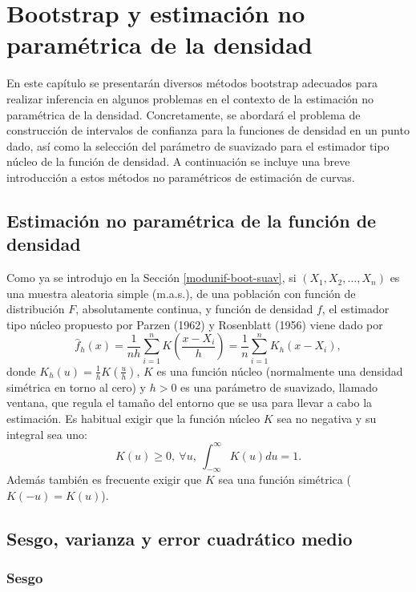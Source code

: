 \documentclass[
]{book}
\theoremstyle{break}
\theoremstyle{nonumberplain}
\begin{document}
\chapter{Bootstrap y estimación no paramétrica de la densidad}\label{npden}

En este capítulo se presentarán diversos métodos bootstrap adecuados
para realizar inferencia en algunos problemas en el contexto de la
estimación no paramétrica de la densidad. Concretamente, se abordará el
problema de construcción de intervalos de confianza para la funciones de
densidad en un punto dado, así como la selección del parámetro de
suavizado para el estimador tipo núcleo de la función de densidad. A
continuación se incluye una breve introducción a estos métodos no
paramétricos de estimación de curvas.

\section{Estimación no paramétrica de la función de densidad}\label{estimaciuxf3n-no-paramuxe9trica-de-la-funciuxf3n-de-densidad}

Como ya se introdujo en la Sección \ref{modunif-boot-suav}, si
\(\left( X_1, X_2, \ldots, X_n \right)\) es una muestra aleatoria simple
(m.a.s.), de una población con función de distribución \(F\), absolutamente
continua, y función de densidad \(f\), el estimador tipo núcleo propuesto por
Parzen (1962) y Rosenblatt (1956) viene dado por
\[\hat{f}_{h}\left( x \right) =\frac{1}{nh}\sum_{i=1}^{n}K\left( \frac{x-X_i}{
h} \right) =\frac{1}{n}\sum_{i=1}^{n}K_{h}\left( x-X_i \right),\]
donde \(K_{h}\left( u \right) =\frac{1}{h}K\left( \frac{u}{h} \right)\),
\(K\) es una función núcleo (normalmente una densidad simétrica en torno al cero)
y \(h>0\) es una parámetro de suavizado, llamado ventana, que regula el
tamaño del entorno que se usa para llevar a cabo la estimación. Es
habitual exigir que la función núcleo \(K\) sea no negativa y su integral
sea uno:
\[K\left( u \right) \geq 0,~\forall u,~\int_{-\infty }^{\infty }
K\left( u \right) du=1.\]
Además también es frecuente exigir que \(K\) sea una
función simétrica (\(K\left( -u \right) =K\left( u \right)\)).

\section{Sesgo, varianza y error cuadrático medio}\label{sesgo-varianza-y-error-cuadruxe1tico-medio}

\subsection{Sesgo}\label{sesgo}
\end{document}
